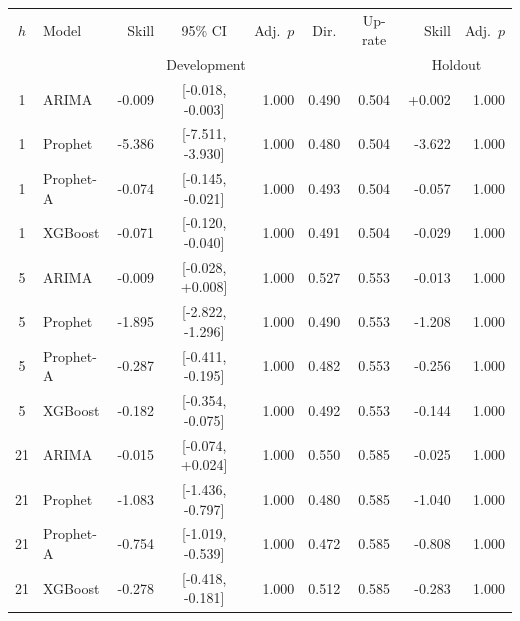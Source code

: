 \begin{tabular}{clrcrccrr}
\toprule
$h$ & Model & Skill & 95\% CI & Adj.\ $p$ & Dir. & Up-rate & Skill & Adj.\ $p$ \\
 & & \multicolumn{3}{c}{Development} & \multicolumn{2}{c}{} & \multicolumn{2}{c}{Holdout} \\
\midrule
1 & ARIMA & -0.009 & [-0.018, -0.003] & 1.000 & 0.490 & 0.504 & +0.002 & 1.000 \\
1 & Prophet & -5.386 & [-7.511, -3.930] & 1.000 & 0.480 & 0.504 & -3.622 & 1.000 \\
1 & Prophet-A & -0.074 & [-0.145, -0.021] & 1.000 & 0.493 & 0.504 & -0.057 & 1.000 \\
1 & XGBoost & -0.071 & [-0.120, -0.040] & 1.000 & 0.491 & 0.504 & -0.029 & 1.000 \\
5 & ARIMA & -0.009 & [-0.028, +0.008] & 1.000 & 0.527 & 0.553 & -0.013 & 1.000 \\
5 & Prophet & -1.895 & [-2.822, -1.296] & 1.000 & 0.490 & 0.553 & -1.208 & 1.000 \\
5 & Prophet-A & -0.287 & [-0.411, -0.195] & 1.000 & 0.482 & 0.553 & -0.256 & 1.000 \\
5 & XGBoost & -0.182 & [-0.354, -0.075] & 1.000 & 0.492 & 0.553 & -0.144 & 1.000 \\
21 & ARIMA & -0.015 & [-0.074, +0.024] & 1.000 & 0.550 & 0.585 & -0.025 & 1.000 \\
21 & Prophet & -1.083 & [-1.436, -0.797] & 1.000 & 0.480 & 0.585 & -1.040 & 1.000 \\
21 & Prophet-A & -0.754 & [-1.019, -0.539] & 1.000 & 0.472 & 0.585 & -0.808 & 1.000 \\
21 & XGBoost & -0.278 & [-0.418, -0.181] & 1.000 & 0.512 & 0.585 & -0.283 & 1.000 \\
\bottomrule
\end{tabular}

